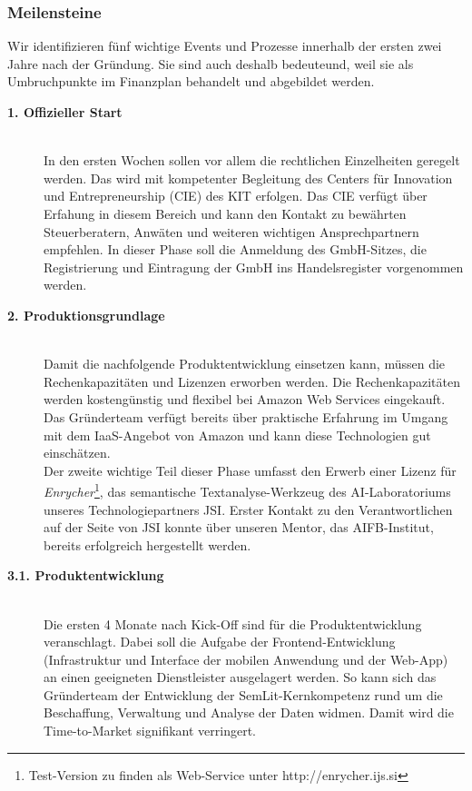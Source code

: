 \subsubsection{Meilensteine}
Wir identifizieren fünf wichtige Events und Prozesse innerhalb der ersten zwei Jahre nach der Gründung. Sie sind auch deshalb bedeuteund, weil sie als Umbruchpunkte im Finanzplan behandelt und abgebildet werden.\\
\begin{description}
  \item[\textbf{1. Offizieller Start}] \hfill \\
In den ersten Wochen sollen vor allem die rechtlichen Einzelheiten geregelt werden. Das wird mit kompetenter Begleitung des Centers für Innovation und Entrepreneurship (CIE) des KIT erfolgen. Das CIE verfügt über Erfahung in diesem Bereich und kann den Kontakt zu bewährten Steuerberatern, Anwäten und weiteren wichtigen Ansprechpartnern empfehlen. In dieser Phase soll die Anmeldung des GmbH-Sitzes, die Registrierung und Eintragung der GmbH ins Handelsregister vorgenommen werden. 
\\
  \item[\textbf{2. Produktionsgrundlage}] \hfill \\
Damit die nachfolgende Produktentwicklung einsetzen kann, müssen die Rechenkapazitäten und Lizenzen erworben werden. Die Rechenkapazitäten werden kostengünstig und flexibel bei {\color{orange}Amazon Web Services} eingekauft. Das Gründerteam verfügt bereits über praktische Erfahrung im Umgang mit dem IaaS-Angebot von Amazon und kann diese Technologien gut einschätzen. 
\\
Der zweite wichtige Teil dieser Phase umfasst den Erwerb einer Lizenz für \emph{Enrycher}\footnote[3]{Test-Version zu finden als Web-Service unter http://enrycher.ijs.si}, das semantische Textanalyse-Werkzeug des AI-Laboratoriums unseres Technologiepartners JSI. Erster Kontakt zu den Verantwortlichen auf der Seite von JSI konnte über unseren Mentor, das AIFB-Institut, bereits erfolgreich hergestellt werden.
\\
  \item[\textbf{3.1. Produktentwicklung}] \hfill \\
Die ersten 4 Monate nach Kick-Off sind für die Produktentwicklung veranschlagt. Dabei soll die Aufgabe der Frontend-Entwicklung (Infrastruktur und Interface der mobilen Anwendung und der Web-App) an einen geeigneten Dienstleister ausgelagert werden. So kann sich das Gründerteam der Entwicklung der SemLit-Kernkompetenz rund um die Beschaffung, Verwaltung und Analyse der Daten widmen. Damit wird die Time-to-Market signifikant verringert.  

\end{description}
